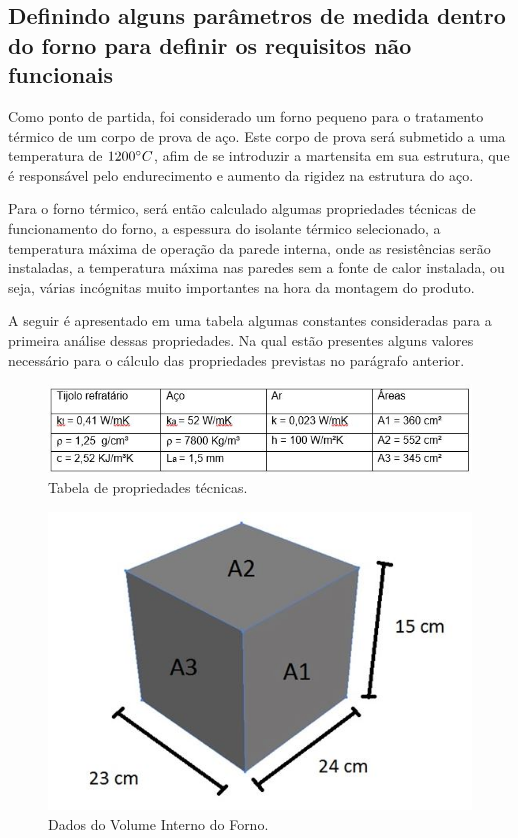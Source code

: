 \subsection{Definindo alguns parâmetros de medida dentro do forno para definir os requisitos não funcionais}

Como ponto de partida, foi considerado um forno pequeno para o tratamento térmico de um corpo de prova de aço. Este corpo de prova será submetido a uma temperatura de $1200 \degree C$, afim de se introduzir a martensita em sua estrutura, que é responsável pelo endurecimento e aumento da rigidez na estrutura do aço.

Para o forno térmico, será então calculado algumas propriedades técnicas de funcionamento do forno, a espessura do isolante térmico selecionado, a temperatura máxima de operação da parede interna, onde as resistências serão instaladas, a temperatura máxima nas paredes sem a fonte de calor instalada, ou seja, várias incógnitas muito importantes na hora da montagem do produto.

A seguir é apresentado em uma tabela algumas constantes consideradas para a primeira análise dessas propriedades. Na qual estão presentes alguns valores necessário para o cálculo das propriedades previstas no parágrafo anterior.

\begin{figure}[!ht]
	\centering
	\label{tab_constantes}
	\includegraphics[keepaspectratio=true,scale=1.0]{figuras/tab_constantes.JPG}
	\caption{Tabela de propriedades técnicas.}
\end{figure}

\begin{figure}[!ht]
	\centering
	\label{vol_interno}
	\includegraphics[keepaspectratio=true,scale=1.0]{figuras/vol_interno.JPG}
	\caption{Dados do Volume Interno do Forno.}
\end{figure}

